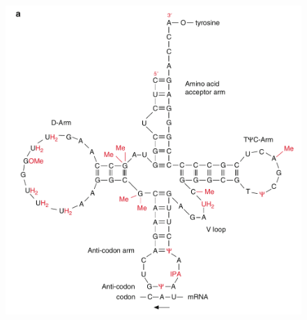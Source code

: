 \documentclass[11pt,ignorenonframetext,aspectratio=169]{beamer}
\begin{document}
\begin{frame}{}
\protect\hypertarget{section-12}{}
\begin{figure}
  \begin{columns}[T,onlytextwidth]

  
  \begin{columns}[T,onlytextwidth]
  \begin{center}
  \includegraphics[width=0.95\linewidth]{../images/ribonucleic_acids_trna.png}
  \end{center}
  

\end{columns}
\end{columns}
\end{figure}
\end{frame}
\end{document}

